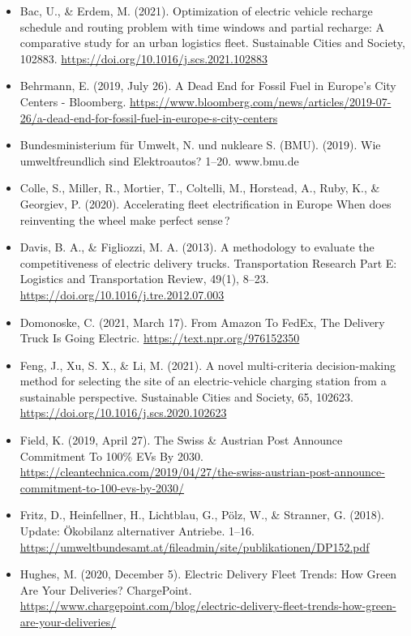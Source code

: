\documentclass[
]{book}
\providecommand{\tightlist}{%
  \setlength{\itemsep}{0pt}\setlength{\parskip}{0pt}}
\begin{document}
\begin{itemize}
\tightlist
\item
  Bac, U., \& Erdem, M. (2021). Optimization of electric vehicle recharge schedule and routing problem with time windows and partial recharge: A comparative study for an urban logistics fleet. Sustainable Cities and Society, 102883. \url{https://doi.org/10.1016/j.scs.2021.102883}
\item
  Behrmann, E. (2019, July 26). A Dead End for Fossil Fuel in Europe's City Centers - Bloomberg. \url{https://www.bloomberg.com/news/articles/2019-07-26/a-dead-end-for-fossil-fuel-in-europe-s-city-centers}
\item
  Bundesministerium für Umwelt, N. und nukleare S. (BMU). (2019). Wie umweltfreundlich sind Elektroautos? 1--20. www.bmu.de
\item
  Colle, S., Miller, R., Mortier, T., Coltelli, M., Horstead, A., Ruby, K., \& Georgiev, P. (2020). Accelerating fleet electrification in Europe When does reinventing the wheel make perfect sense\,?
\item
  Davis, B. A., \& Figliozzi, M. A. (2013). A methodology to evaluate the competitiveness of electric delivery trucks. Transportation Research Part E: Logistics and Transportation Review, 49(1), 8--23. \url{https://doi.org/10.1016/j.tre.2012.07.003}
\item
  Domonoske, C. (2021, March 17). From Amazon To FedEx, The Delivery Truck Is Going Electric. \url{https://text.npr.org/976152350}
\item
  Feng, J., Xu, S. X., \& Li, M. (2021). A novel multi-criteria decision-making method for selecting the site of an electric-vehicle charging station from a sustainable perspective. Sustainable Cities and Society, 65, 102623. \url{https://doi.org/10.1016/j.scs.2020.102623}
\item
  Field, K. (2019, April 27). The Swiss \& Austrian Post Announce Commitment To 100\% EVs By 2030. \url{https://cleantechnica.com/2019/04/27/the-swiss-austrian-post-announce-commitment-to-100-evs-by-2030/}
\item
  Fritz, D., Heinfellner, H., Lichtblau, G., Pölz, W., \& Stranner, G. (2018). Update: Ökobilanz alternativer Antriebe. 1--16. \url{https://umweltbundesamt.at/fileadmin/site/publikationen/DP152.pdf}
\item
  Hughes, M. (2020, December 5). Electric Delivery Fleet Trends: How Green Are Your Deliveries? \textbar{} ChargePoint. \url{https://www.chargepoint.com/blog/electric-delivery-fleet-trends-how-green-are-your-deliveries/}

\end{itemize}
\end{document}
